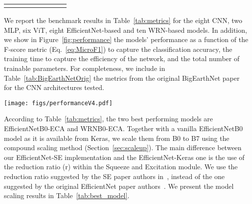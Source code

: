 \documentclass[journal]{IEEEtran}
\begin{document}
\begin{table*}[h!]
\begin{tabular}{c c c c c c c c}
 \bottomrule \\
\end{tabular}
\caption{Results of the benchmark, conducted with the distributed learning framework, for the eight CNN, two MLP, six transformer, eight EfficientNet-based, and ten WRN-based models. ResNet50$^{1 GPU}$ metrics correspond to the ResNet50 model when trained in one GPU only. For each model family, we highlight in bold the best metric achieved, concerning F-Score, training time, and inference rate. EfficientNetB0-ECA and WRNB0-EC, in bold, are the two best performing models in the benchmark, which we select to scale through compound scaling (Section~\ref{sec:scaleup}).}
\label{tab:metrics}
\end{table*}


We report the benchmark results in Table~\ref{tab:metrics} for the eight CNN, two MLP, six ViT, eight EfficientNet-based and ten WRN-based models. In addition, we show in Figure~\ref{fig:performance} the models' performance as a function of the F-score metric (Eq.~\ref{eq:MicroF1}) to capture the classification accuracy, the training time to capture the efficiency of the network, and the total number of trainable parameters. For completeness, we include in Table~\ref{tab:BigEarthNetOrig} the metrics from the original BigEarthNet paper~\citep{sumbul2020bigearthnet} for the CNN architectures tested. 

\begin{figure*}[ht]

 \texttt{[image: figs/performanceV4.pdf]}
\caption{Performance vs training time trade-off for the different models evaluated. All models of Table~\ref{tab:metrics} are included, plus our best performing model of Table~\ref{tab:best_model}: WRN-B4-ECA. The size of the bubbles is proportional to the size of the model. Training time is estimated on a cluster of 20 Tesla K40 GPUs.}
\label{fig:performance}
\end{figure*}

According to Table~\ref{tab:metrics}, the two best performing models are EfficientNetB0-ECA and WRNB0-ECA. Together with a vanilla EfficientNetB0 model as it is available from Keras, we scale them from B0 to B7 using the compound scaling method (Section~\ref{sec:scaleup}). 
The main difference between our EfficientNet-SE implementation and the EfficientNet-Keras one is the use of the reduction ratio (r) within the Squeeze and Excitation module. We use the reduction ratio suggested by the SE paper authors in~\cite{Hu_2018_CVPR}, instead of the one suggested by the original EfficientNet paper authors~\citep{pmlr-v97-tan19a}.
We present the model scaling results in Table~\ref{tab:best_model}.
\end{document}
